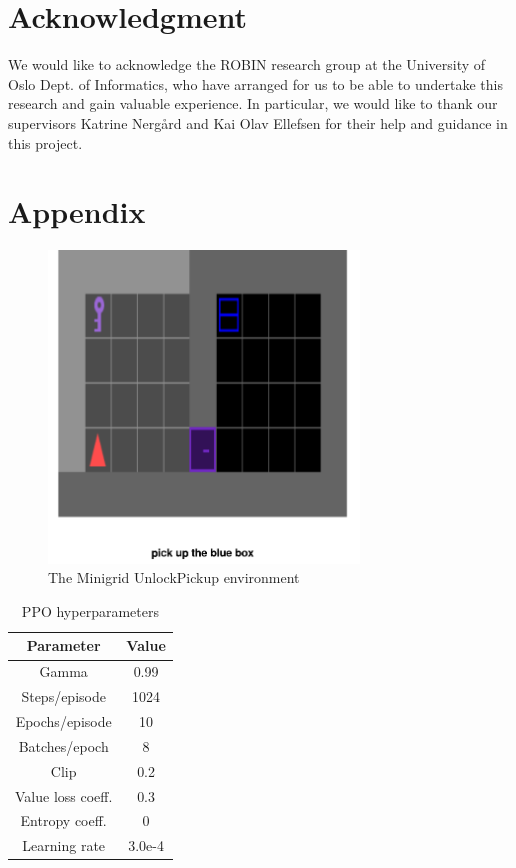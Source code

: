 \documentclass[conference]{IEEEtran}
\begin{document}
\section*{Acknowledgment}

We would like to acknowledge the ROBIN research group at the University of Oslo Dept. of Informatics, who have arranged for us to be able to undertake this research and gain valuable experience. In particular, we would like to thank our supervisors Katrine Nergård and Kai Olav Ellefsen for their help and guidance in this project.





\section*{Appendix}

\begin{figure}[h]
\centerline{\includegraphics[width=3.25in]{figure/unlockpickupenv.png}}
\caption{The Minigrid UnlockPickup environment}
\label{unlockpickupenv}
\end{figure}

\begin{table}[h]
\caption{PPO hyperparameters}
\begin{center}
\label{hyperparams_transposed}
\begin{tabular}{c | c}
Parameter & Value \\
\hline
Gamma & 0.99 \\
Steps/episode & 1024 \\
Epochs/episode & 10 \\
Batches/epoch & 8 \\
Clip & 0.2 \\
Value loss coeff. & 0.3 \\
Entropy coeff. & 0 \\
Learning rate & 3.0e-4 \\
\end{tabular}
\end{center}
\end{table}
\end{document}
